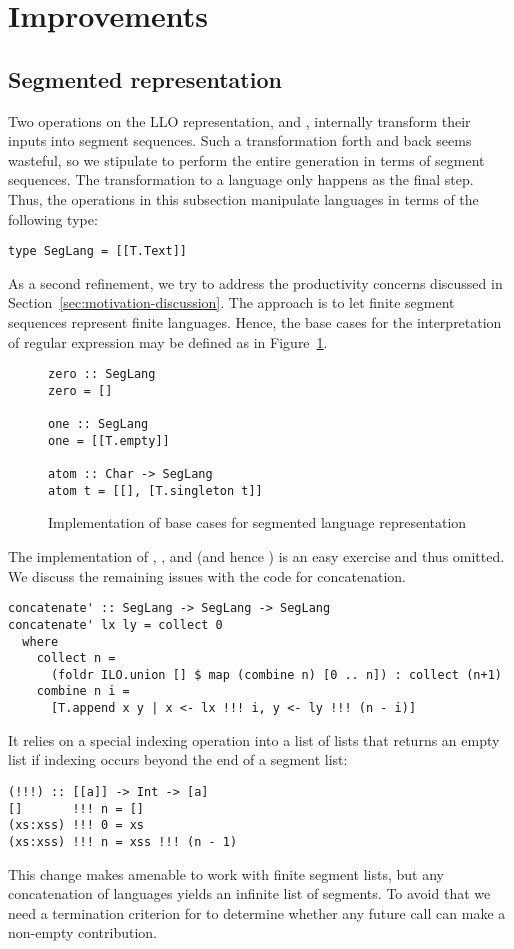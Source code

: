 \section{Improvements}
\label{sec:improvements}

\subsection{Segmented representation}
\label{sec:segm-repr}

Two operations on the LLO representation,  and
, internally transform their inputs into segment
sequences. Such a transformation forth and back seems wasteful, so we
stipulate to perform the entire generation in terms of segment
sequences. The transformation to a language only happens as the final
step. Thus, the operations in this subsection manipulate languages in
terms of the following type:
\begin{lstlisting}[numbers=false]
type SegLang = [[T.Text]]
\end{lstlisting}

As a second refinement, we try to address the productivity concerns
discussed in Section~\ref{sec:motivation-discussion}. The approach is
to let finite segment sequences represent finite languages. Hence, the
base cases for the interpretation of regular expression may be defined
as in Figure~\ref{fig:base-cases-segmented}.
\begin{figure}[tp]
\begin{lstlisting}
zero :: SegLang
zero = []

one :: SegLang
one = [[T.empty]]

atom :: Char -> SegLang
atom t = [[], [T.singleton t]]
\end{lstlisting}
  \caption{Implementation of base cases for segmented language representation}
  \label{fig:base-cases-segmented}
\end{figure}
The implementation of , , and
 (and hence ) is an easy exercise and thus omitted.
We discuss the remaining issues with the code for concatenation.
\begin{lstlisting}
concatenate' :: SegLang -> SegLang -> SegLang
concatenate' lx ly = collect 0
  where
    collect n =
      (foldr ILO.union [] $ map (combine n) [0 .. n]) : collect (n+1)
    combine n i =
      [T.append x y | x <- lx !!! i, y <- ly !!! (n - i)]
\end{lstlisting}
It relies on a special indexing operation into a list of lists that returns an empty
list if indexing occurs beyond the end of a segment list:
\begin{lstlisting}
(!!!) :: [[a]] -> Int -> [a]
[]       !!! n = []
(xs:xss) !!! 0 = xs
(xs:xss) !!! n = xss !!! (n - 1)
\end{lstlisting}
This change makes  amenable to work with finite
segment lists, 
but any concatenation of languages yields an infinite list of
segments. To avoid that we need a termination criterion for
 to determine whether any future call can make a
non-empty contribution.

